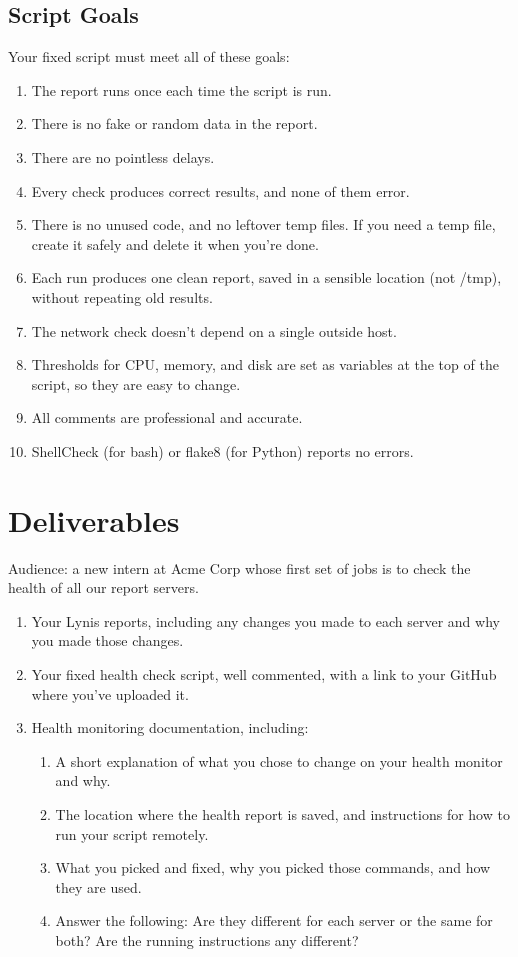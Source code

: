 \documentclass[12pt]{article}
\begin{document}
\subsection*{Script Goals}
Your fixed script must meet all of these goals:
\begin{enumerate}
    \item The report runs once each time the script is run.
    \item There is no fake or random data in the report.
    \item There are no pointless delays.
    \item Every check produces correct results, and none of them error.
    \item There is no unused code, and no leftover temp files. If you need a temp file, create it safely and delete it when you're done.
    \item Each run produces one clean report, saved in a sensible location (not /tmp), without repeating old results.
    \item The network check doesn't depend on a single outside host.
    \item Thresholds for CPU, memory, and disk are set as variables at the top of the script, so they are easy to change.
    \item All comments are professional and accurate.
    \item ShellCheck (for bash) or flake8 (for Python) reports no errors.
\end{enumerate}

\section*{Deliverables}
Audience: a new intern at Acme Corp whose first set of jobs is to check the health of all our report servers.
\begin{enumerate}
    \item Your Lynis reports, including any changes you made to each server and why you made those changes.
    \item Your fixed health check script, well commented, with a link to your GitHub where you've uploaded it.
    \item Health monitoring documentation, including:
    \begin{enumerate}
        \item A short explanation of what you chose to change on your health monitor and why.
        \item The location where the health report is saved, and instructions for how to run your script remotely.
        \item What you picked and fixed, why you picked those commands, and how they are used.
        \item Answer the following: Are they different for each server or the same for both? Are the running instructions any different?
    \end{enumerate}
\end{enumerate}
\end{document}
